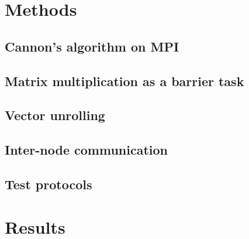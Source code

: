 \documentclass[fleqn,10pt]{SelfArx} %
\begin{document}


\section{Methods} %
\label{sec:methods}

\subsection{Cannon's algorithm on MPI} %
\label{sub:cannon_s_algorithm_on_mpi}


\subsection{Matrix multiplication as a barrier task} %
\label{sub:matrix_multiplication_as_a_barrier_task}


\subsection{Vector unrolling} %
\label{sub:vector_unrolling}


\subsection{Inter-node communication} %
\label{sub:inter_node_communication}


\subsection{Test protocols} %
\label{sub:test_protocols}



\section{Results} %
\label{sec:results}

\end{document}
